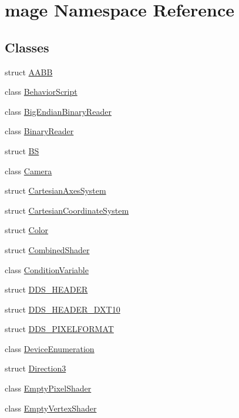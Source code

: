 \hypertarget{namespacemage}{}\section{mage Namespace Reference}
\label{namespacemage}
\subsection*{Classes}
\begin{DoxyCompactItemize}
\item 
struct \hyperlink{structmage_1_1_a_a_b_b}{A\+A\+BB}
\item 
class \hyperlink{classmage_1_1_behavior_script}{Behavior\+Script}
\item 
class \hyperlink{classmage_1_1_big_endian_binary_reader}{Big\+Endian\+Binary\+Reader}
\item 
class \hyperlink{classmage_1_1_binary_reader}{Binary\+Reader}
\item 
struct \hyperlink{structmage_1_1_b_s}{BS}
\item 
class \hyperlink{classmage_1_1_camera}{Camera}
\item 
struct \hyperlink{structmage_1_1_cartesian_axes_system}{Cartesian\+Axes\+System}
\item 
struct \hyperlink{structmage_1_1_cartesian_coordinate_system}{Cartesian\+Coordinate\+System}
\item 
struct \hyperlink{structmage_1_1_color}{Color}
\item 
struct \hyperlink{structmage_1_1_combined_shader}{Combined\+Shader}
\item 
class \hyperlink{classmage_1_1_condition_variable}{Condition\+Variable}
\item 
struct \hyperlink{structmage_1_1_d_d_s___h_e_a_d_e_r}{D\+D\+S\+\_\+\+H\+E\+A\+D\+ER}
\item 
struct \hyperlink{structmage_1_1_d_d_s___h_e_a_d_e_r___d_x_t10}{D\+D\+S\+\_\+\+H\+E\+A\+D\+E\+R\+\_\+\+D\+X\+T10}
\item 
struct \hyperlink{structmage_1_1_d_d_s___p_i_x_e_l_f_o_r_m_a_t}{D\+D\+S\+\_\+\+P\+I\+X\+E\+L\+F\+O\+R\+M\+AT}
\item 
class \hyperlink{classmage_1_1_device_enumeration}{Device\+Enumeration}
\item 
struct \hyperlink{structmage_1_1_direction3}{Direction3}
\item 
class \hyperlink{classmage_1_1_empty_pixel_shader}{Empty\+Pixel\+Shader}
\item 
class \hyperlink{classmage_1_1_empty_vertex_shader}{Empty\+Vertex\+Shader}

\end{DoxyCompactItemize}
